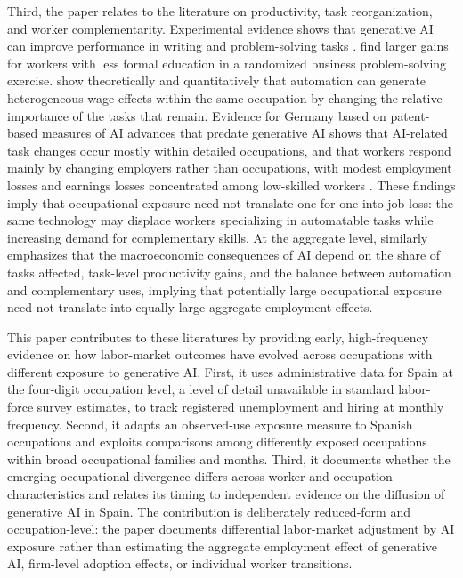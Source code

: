 Third, the paper relates to the literature on productivity, task reorganization, and worker complementarity. Experimental evidence shows that generative AI can improve performance in writing and problem-solving tasks \citep{noy_zhang_2023}. \citet{cruces_et_al_2026} find larger gains for workers with less formal education in a randomized business problem-solving exercise. \citet{freund_mann_2026} show theoretically and quantitatively that automation can generate heterogeneous wage effects within the same occupation by changing the relative importance of the tasks that remain. Evidence for Germany based on patent-based measures of AI advances that predate generative AI shows that AI-related task changes occur mostly within detailed occupations, and that workers respond mainly by changing employers rather than occupations, with modest employment losses and earnings losses concentrated among low-skilled workers \citep{gathmann2024ai}. These findings imply that occupational exposure need not translate one-for-one into job loss: the same technology may displace workers specializing in automatable tasks while increasing demand for complementary skills. At the aggregate level, \citet{acemoglu_2025} similarly emphasizes that the macroeconomic consequences of AI depend on the share of tasks affected, task-level productivity gains, and the balance between automation and complementary uses, implying that potentially large occupational exposure need not translate into equally large aggregate employment effects.

This paper contributes to these literatures by providing early, high-frequency evidence on how labor-market outcomes have evolved across occupations with different exposure to generative AI. First, it uses administrative data for Spain at the four-digit occupation level, a level of detail unavailable in standard labor-force survey estimates, to track registered unemployment and hiring at monthly frequency. Second, it adapts an observed-use exposure measure to Spanish occupations and exploits comparisons among differently exposed occupations within broad occupational families and months. Third, it documents whether the emerging occupational divergence differs across worker and occupation characteristics and relates its timing to independent evidence on the diffusion of generative AI in Spain. The contribution is deliberately reduced-form and occupation-level: the paper documents differential labor-market adjustment by AI exposure rather than estimating the aggregate employment effect of generative AI, firm-level adoption effects, or individual worker transitions.

